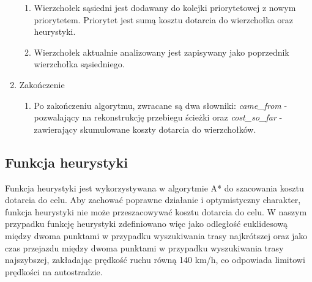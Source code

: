 \documentclass{article}
\begin{document}
\begin{enumerate}
\begin{enumerate}
        \item Wierzchołek sąsiedni jest dodawany do kolejki priorytetowej z nowym priorytetem. Priorytet jest sumą kosztu dotarcia do wierzchołka oraz heurystyki.
        \item Wierzchołek aktualnie analizowany jest zapisywany jako poprzednik wierzchołka sąsiedniego.
    \end{enumerate}
    \item Zakończenie 
    \begin{enumerate}
        \item Po zakończeniu algorytmu, zwracane są dwa słowniki: \textit{came\_from} - pozwalający na rekonstrukcję przebiegu ścieżki oraz \textit{cost\_so\_far} - zawierający skumulowane koszty dotarcia do wierzchołków.
    \end{enumerate}
\end{enumerate}

\subsection{Funkcja heurystyki}
Funkcja heurystyki jest wykorzystywana w algorytmie A* do szacowania kosztu dotarcia do celu. Aby zachować poprawne działanie i optymistyczny charakter, funkcja heurystyki nie może przeszacowywać kosztu dotarcia do celu. W naszym przypadku funkcję heurystyki zdefiniowano więc jako odległość euklidesową między dwoma punktami w przypadku wyszukiwania trasy najkrótszej oraz jako czas przejazdu między dwoma punktami w przypadku wyszukiwania trasy najszybszej, zakładając prędkość ruchu równą 140 km/h, co odpowiada limitowi prędkości na autostradzie.
\end{document}
